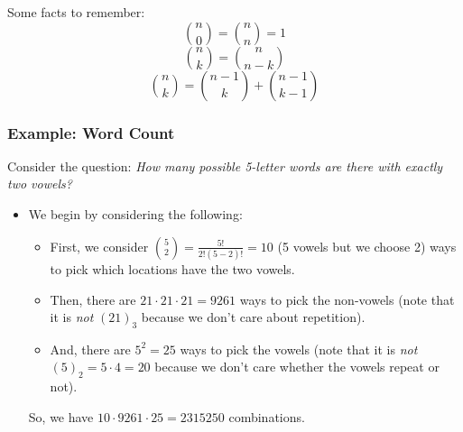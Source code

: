 \documentclass[letterpaper]{article}
\begin{document}
\bigskip 

Some facts to remember: 
\[\binom{n}{0} = \binom{n}{n} = 1\]
\[\binom{n}{k} = \binom{n}{n - k}\]
\[\binom{n}{k} = \binom{n - 1}{k} + \binom{n - 1}{k - 1}\]

\subsubsection{Example: Word Count}
Consider the question: \emph{How many possible 5-letter words are there with exactly two vowels?}
\begin{itemize}
    \item We begin by considering the following:
    \begin{itemize}
        \item First, we consider $\binom{5}{2} = \frac{5!}{2!(5 - 2)!} = 10$ (5 vowels but we choose 2) ways to pick which locations have the two vowels.
        \item Then, there are $21 \cdot 21 \cdot 21 = 9261$ ways to pick the non-vowels (note that it is \emph{not} $(21)_3$ because we don't care about repetition).
        \item And, there are $5^2 = 25$ ways to pick the vowels (note that it is \emph{not} $(5)_2 = 5 \cdot 4 = 20$ because we don't care whether the vowels repeat or not). 
    \end{itemize}
    So, we have $10 \cdot 9261 \cdot 25 = \boxed{2315250}$ combinations.
\end{itemize}








\newpage 
\end{document}
